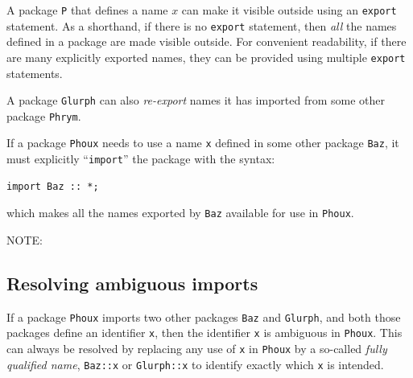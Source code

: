 
A package \verb|P| that defines a name $x$ can make it visible outside
using an \verb|export| statement.  As a shorthand, if there is no
\verb|export| statement, then \emph{all} the names defined in a
package are made visible outside.  For convenient readability, if
there are many explicitly exported names, they can be provided using
multiple \verb|export| statements.

A package \verb|Glurph| can also \emph{re-export} names it has
imported from some other package \verb|Phrym|.

If a package \verb|Phoux| needs to use a name \verb|x| defined in some
other package \verb|Baz|, it must explicitly ``\verb|import|'' the
package with the syntax:

{\footnotesize
\begin{Verbatim}[frame=single]
import Baz :: *;
\end{Verbatim}
}

which makes all the names exported by \verb|Baz| available for use in
\verb|Phoux|.

\vspace{2ex}

NOTE: 


\subsection{Resolving ambiguous imports}


If a package \verb|Phoux| imports two other packages \verb|Baz| and
\verb|Glurph|, and both those packages define an identifier \verb|x|,
then the identifier \verb|x| is ambiguous in \verb|Phoux|.  This can
always be resolved by replacing any use of \verb|x| in \verb|Phoux| by
a so-called \emph{fully qualified name}, \verb|Baz::x| or
\verb|Glurph::x| to identify exactly which \verb|x| is intended.

